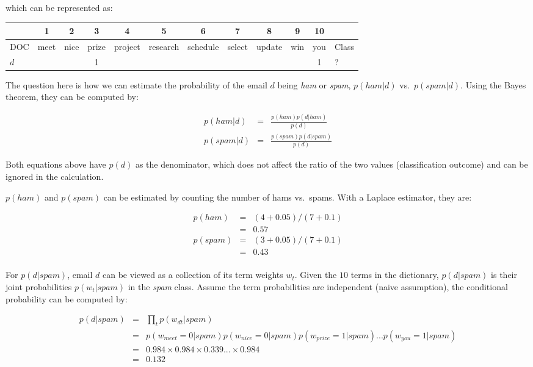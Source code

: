 \documentclass[
  letterpaper,
]{scrbook}
\newcounter{none} %
\begin{document}
\protect{}\label{tab-text-emails_new}{}

which can be represented as:

{\def\LTcaptype{none} %
\begin{longtable}[]{@{}lccccccccccl@{}}
\toprule\noalign{}
& 1 & 2 & 3 & 4 & 5 & 6 & 7 & 8 & 9 & 10 & \\
\midrule\noalign{}
\endhead
\bottomrule\noalign{}
\endlastfoot
DOC & meet & nice & prize & project & research & schedule & select &
update & win & you & Class \\
\(d\) & & & 1 & & & & & & & 1 & ? \\
\end{longtable}
}

\protect{}\label{tab-text-new_bin}{}

The question here is how we can estimate the probability of the email
\(d\) being \emph{ham} or \emph{spam}, \(p(ham|d)\) vs.~\(p(spam|d)\).
Using the Bayes theorem, they can be computed by:

\[\begin{aligned}
  p(ham|d) & = & \frac{p(ham)p(d|ham)}{p(d)} \\
  p(spam|d) & = & \frac{p(spam)p(d|spam)}{p(d)} 
\end{aligned}\]

Both equations above have \(p(d)\) as the denominator, which does not
affect the ratio of the two values (classification outcome) and can be
ignored in the calculation.

\(p(ham)\) and \(p(spam)\) can be estimated by counting the number of
hams vs.~spams. With a Laplace estimator, they are:

\[\begin{aligned}
  p(ham)  & = & (4+0.05)/(7+0.1) \\
                & = & 0.57 \\
  p(spam)   & = & (3+0.05)/(7+0.1) \\
                & = & 0.43 \\
\end{aligned}\]

For \(p(d|spam)\), email \(d\) can be viewed as a collection of its term
weights \(w_t\). Given the \(10\) terms in the dictionary, \(p(d|spam)\)
is their joint probabilities \(p(w_t|spam)\) in the \emph{spam} class.
Assume the term probabilities are independent (naive assumption), the
conditional probability can be computed by:

\[\begin{aligned}
  p(d|spam)
  & = & \prod_{t} p(w_{dt}|spam) \\
  & = & p(w_{meet}=0|spam) p(w_{nice}=0|spam) p(w_{prize}=1|spam) ... p(w_{you}=1|spam) \\
  & = & 0.984 \times 0.984 \times 0.339 ... \times 0.984 \\
  & = & 0.132
\end{aligned}\]
\end{document}
